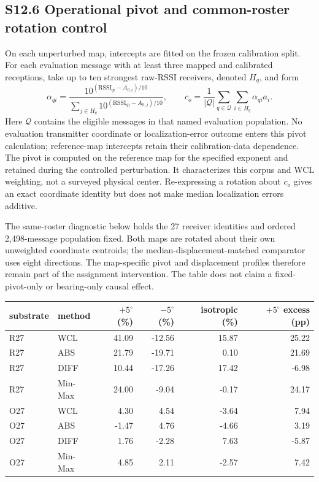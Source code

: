 \documentclass[journal,onecolumn,10pt]{IEEEtran}
\begin{document}
\subsection*{S12.6 Operational pivot and common-roster rotation control}

On each unperturbed map, intercepts are fitted on the frozen calibration split. For each evaluation message with at least three mapped and calibrated receptions, take up to ten strongest raw-RSSI receivers, denoted $H_q$, and form
\begin{equation}\label{eq:s-display-2}
\alpha_{qi}=\frac{10^{(\mathrm{RSSI}_{qi}-A_{0,i})/10}}
 {\sum_{j\in H_q}10^{(\mathrm{RSSI}_{qj}-A_{0,j})/10}},\qquad
 c_o=\frac{1}{|\mathcal Q|}\sum_{q\in\mathcal Q}\sum_{i\in H_q}\alpha_{qi}a_i.
\end{equation}
Here $\mathcal Q$ contains the eligible messages in that named evaluation population. No evaluation transmitter coordinate or localization-error outcome enters this pivot calculation; reference-map intercepts retain their calibration-data dependence. The pivot is computed on the reference map for the specified exponent and retained during the controlled perturbation. It characterizes this corpus and WCL weighting, not a surveyed physical center. Re-expressing a rotation about $c_o$ gives an exact coordinate identity but does not make median localization errors additive.

The same-roster diagnostic below holds the 27 receiver identities and ordered 2,498-message population fixed. Both maps are rotated about their own unweighted coordinate centroids; the median-displacement-matched comparator uses eight directions. The map-specific pivot and displacement profiles therefore remain part of the assignment intervention. The table does not claim a fixed-pivot-only or bearing-only causal effect.

\begin{center}\begin{minipage}{\textwidth}\centering
{}

\begin{tabular}{@{}llrrrr@{}}
\toprule
substrate & method & $+5^{\circ}$ (\%) & $-5^{\circ}$ (\%) & isotropic (\%) & $+5^{\circ}$ excess (pp) \\
\midrule

R27 & WCL & 41.09 & -12.56 & 15.87 & 25.22 \\
R27 & ABS & 21.79 & -19.71 & 0.10 & 21.69 \\
R27 & DIFF & 10.44 & -17.26 & 17.42 & -6.98 \\
R27 & Min-Max & 24.00 & -9.04 & -0.17 & 24.17 \\
O27 & WCL & 4.30 & 4.54 & -3.64 & 7.94 \\
O27 & ABS & -1.47 & 4.76 & -4.66 & 3.19 \\
O27 & DIFF & 1.76 & -2.28 & 7.63 & -5.87 \\
O27 & Min-Max & 4.85 & 2.11 & -2.57 & 7.42 \\
\bottomrule
\end{tabular}
\end{minipage}\end{center}
\end{document}
